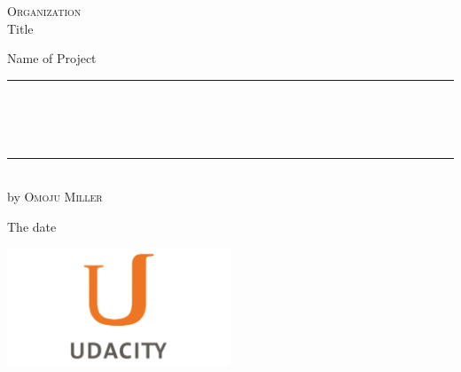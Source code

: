 
\begin{titlepage}
    \begin{addmargin}[-1cm]{-3cm}
    \begin{center}
        \large
        {\Large \textsc{Organization}}\\[1ex]
        Title\\
       

        \vfill

        Name of Project\\ \vskip1cm
        \rule{14cm}{0.4pt}\\ \bigskip
        \begingroup
            \Large
            \color{Maroon}\spacedallcaps{\myTitle} \\ \bigskip
        \endgroup
        \spacedlowsmallcaps{\mySubtitle} \\ \bigskip
        \rule{14cm}{0.4pt}\\ \vskip1cm
        by \textsc{Omoju Miller}

        \vfill
        \vfill
        \vfill

       
        \hfill The date
    \end{center}
    \vspace{-3.5cm}
    \includegraphics[width=0.50\textwidth]{figures/udacity_logo}
  \end{addmargin}
\end{titlepage}
